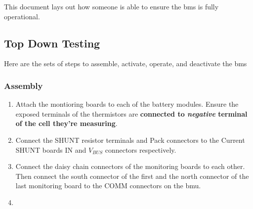 This document lays out how someone is able to ensure the \gls{bms} is fully operational.

\subsection{Top Down Testing}

Here are the sets of steps to assemble, activate, operate, and deactivate the \gls{bms}

\subsubsection{Assembly}

\begin{enumerate}
	\item Attach the montioring boards to each of the battery modules. Ensure the exposed terminals of  the thermistors are \textbf{connected to \emph{negative} terminal of the cell they're measuring}.
	\item  Connect the SHUNT resistor terminals and Pack connectors to the Current SHUNT boards IN and $V_{BUS}$ connectors respectively. 
	\item Connect the daisy chain connectors of the monitoring boards to each other. Then connect the south connector of the first and the north connector of the last monitoring board to the COMM connectors on the \gls{bmu}.
	\item 
\end{enumerate}